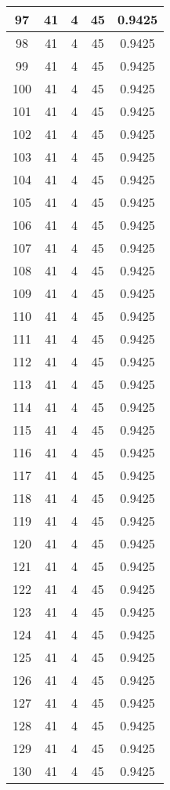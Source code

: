 \documentclass[letterpaper, 12pt]{article}
\begin{document}
\begin{longtable}{|c|c|c|c|c|}
\hline
97 & 41 & 4 & 45 & 0.9425 \\
\hline
98 & 41 & 4 & 45 & 0.9425 \\
\hline
99 & 41 & 4 & 45 & 0.9425 \\
\hline
100 & 41 & 4 & 45 & 0.9425 \\
\hline
101 & 41 & 4 & 45 & 0.9425 \\
\hline
102 & 41 & 4 & 45 & 0.9425 \\
\hline
103 & 41 & 4 & 45 & 0.9425 \\
\hline
104 & 41 & 4 & 45 & 0.9425 \\
\hline
105 & 41 & 4 & 45 & 0.9425 \\
\hline
106 & 41 & 4 & 45 & 0.9425 \\
\hline
107 & 41 & 4 & 45 & 0.9425 \\
\hline
108 & 41 & 4 & 45 & 0.9425 \\
\hline
109 & 41 & 4 & 45 & 0.9425 \\
\hline
110 & 41 & 4 & 45 & 0.9425 \\
\hline
111 & 41 & 4 & 45 & 0.9425 \\
\hline
112 & 41 & 4 & 45 & 0.9425 \\
\hline
113 & 41 & 4 & 45 & 0.9425 \\
\hline
114 & 41 & 4 & 45 & 0.9425 \\
\hline
115 & 41 & 4 & 45 & 0.9425 \\
\hline
116 & 41 & 4 & 45 & 0.9425 \\
\hline
117 & 41 & 4 & 45 & 0.9425 \\
\hline
118 & 41 & 4 & 45 & 0.9425 \\
\hline
119 & 41 & 4 & 45 & 0.9425 \\
\hline
120 & 41 & 4 & 45 & 0.9425 \\
\hline
121 & 41 & 4 & 45 & 0.9425 \\
\hline
122 & 41 & 4 & 45 & 0.9425 \\
\hline
123 & 41 & 4 & 45 & 0.9425 \\
\hline
124 & 41 & 4 & 45 & 0.9425 \\
\hline
125 & 41 & 4 & 45 & 0.9425 \\
\hline
126 & 41 & 4 & 45 & 0.9425 \\
\hline
127 & 41 & 4 & 45 & 0.9425 \\
\hline
128 & 41 & 4 & 45 & 0.9425 \\
\hline
129 & 41 & 4 & 45 & 0.9425 \\
\hline
130 & 41 & 4 & 45 & 0.9425 \\

\end{longtable}
\end{document}
